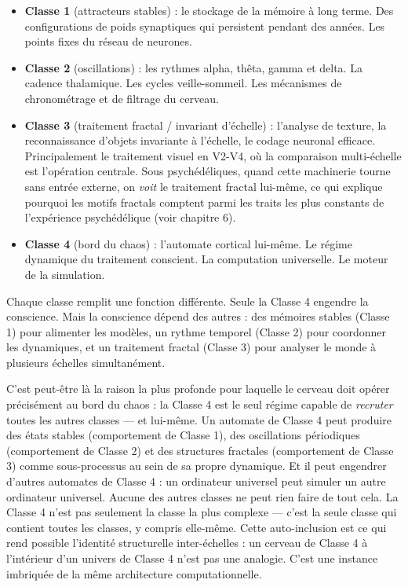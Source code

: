 \documentclass[11pt, twoside, openright]{book}
\begin{document}
\begin{itemize}
  \item \textbf{Classe 1} (attracteurs stables) : le stockage de la mémoire à long terme. Des configurations de poids synaptiques qui persistent pendant des années. Les points fixes du réseau de neurones.
  \item \textbf{Classe 2} (oscillations) : les rythmes alpha, thêta, gamma et delta. La cadence thalamique. Les cycles veille-sommeil. Les mécanismes de chronométrage et de filtrage du cerveau.
  \item \textbf{Classe 3} (traitement fractal / invariant d'échelle) : l'analyse de texture, la reconnaissance d'objets invariante à l'échelle, le codage neuronal efficace. Principalement le traitement visuel en V2-V4, où la comparaison multi-échelle est l'opération centrale. Sous psychédéliques, quand cette machinerie tourne sans entrée externe, on \textit{voit} le traitement fractal lui-même, ce qui explique pourquoi les motifs fractals comptent parmi les traits les plus constants de l'expérience psychédélique (voir chapitre 6).
  \item \textbf{Classe 4} (bord du chaos) : l'automate cortical lui-même. Le régime dynamique du traitement conscient. La computation universelle. Le moteur de la simulation.
\end{itemize}

Chaque classe remplit une fonction différente. Seule la Classe 4 engendre la conscience. Mais la conscience dépend des autres : des mémoires stables (Classe 1) pour alimenter les modèles, un rythme temporel (Classe 2) pour coordonner les dynamiques, et un traitement fractal (Classe 3) pour analyser le monde à plusieurs échelles simultanément.

C'est peut-être là la raison la plus profonde pour laquelle le cerveau doit opérer précisément au bord du chaos : la Classe 4 est le seul régime capable de \textit{recruter} toutes les autres classes --- et lui-même. Un automate de Classe 4 peut produire des états stables (comportement de Classe 1), des oscillations périodiques (comportement de Classe 2) et des structures fractales (comportement de Classe 3) comme sous-processus au sein de sa propre dynamique. Et il peut engendrer d'autres automates de Classe 4 : un ordinateur universel peut simuler un autre ordinateur universel. Aucune des autres classes ne peut rien faire de tout cela. La Classe 4 n'est pas seulement la classe la plus complexe --- c'est la seule classe qui contient toutes les classes, y compris elle-même. Cette auto-inclusion est ce qui rend possible l'identité structurelle inter-échelles : un cerveau de Classe 4 à l'intérieur d'un univers de Classe 4 n'est pas une analogie. C'est une instance imbriquée de la même architecture computationnelle.
\end{document}
